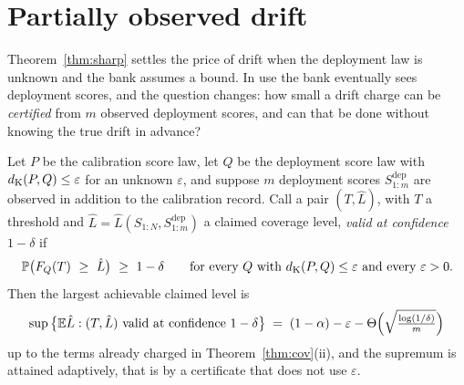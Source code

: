 \documentclass[../../../main.tex]{subfiles}
\begin{document}
\section{Partially observed drift}\label{sec:sharp-drift}

Theorem~\ref{thm:sharp} settles the price of drift when the deployment law is unknown and the bank assumes a bound. In use the bank eventually sees deployment scores, and the question changes: how small a drift charge can be \emph{certified} from $m$ observed deployment scores, and can that be done without knowing the true drift in advance?

\begin{theorem}\label{thm:block-drift}
Let $P$ be the calibration score law, let $Q$ be the deployment score law with $d_{\mathrm{K}}(P,Q)\le\varepsilon$ for an unknown $\varepsilon$, and suppose $m$ deployment scores $S^{\mathrm{dep}}_{1:m}$ are observed in addition to the calibration record. Call a pair $(T,\hat L)$, with $T$ a threshold and $\hat L=\hat L(S_{1:N},S^{\mathrm{dep}}_{1:m})$ a claimed coverage level, \emph{valid at confidence $1-\delta$} if
\[
\Prob\big(F_Q(T)\ \ge\ \hat L\big)\ \ge\ 1-\delta\qquad\text{for every }Q\text{ with }\dK(P,Q)\le\varepsilon\text{ and every }\varepsilon>0 .
\]
Then the largest achievable claimed level is
\[
\sup\big\{\mathbb{E}\hat L:(T,\hat L)\text{ valid at confidence }1-\delta\big\}
\;=\;(1-\alpha)-\varepsilon-\Theta\Big(\sqrt{\tfrac{\log(1/\delta)}m}\Big)
\]
up to the terms already charged in Theorem~\ref{thm:cov}(ii), and the supremum is attained adaptively, that is by a certificate that does not use $\varepsilon$.
\end{theorem}
\end{document}
